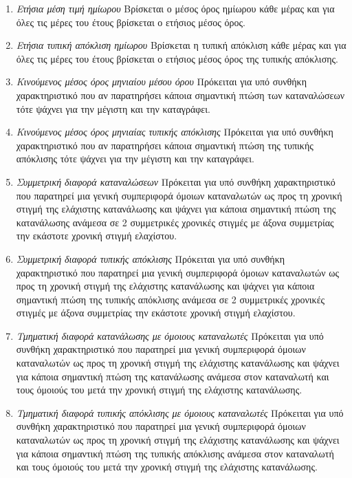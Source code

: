 \documentclass[a4paper, 11pt]{article}
\begin{document}
\begin{enumerate}
\item{\textit{Ετήσια μέση τιμή ημίωρου}} Βρίσκεται ο μέσος όρος ημίωρου κάθε μέρας και για όλες τις μέρες του έτους βρίσκεται ο ετήσιος μέσος όρος.
\item{\textit{Ετήσια τυπική απόκλιση ημίωρου}} Βρίσκεται η τυπική απόκλιση κάθε μέρας και για όλες τις μέρες του έτους βρίσκεται ο ετήσιος μέσος όρος της τυπικής απόκλισης.
\item{\textit{Κινούμενος μέσος όρος μηνιαίου μέσου όρου}} Πρόκειται για υπό συνθήκη χαρακτηριστικό που αν παρατηρήσει κάποια σημαντική πτώση των καταναλώσεων τότε ψάχνει για την μέγιστη και την καταγράφει. 
\item{\textit{Κινούμενος μέσος όρος μηνιαίας τυπικής απόκλισης}} Πρόκειται για υπό συνθήκη χαρακτηριστικό που αν παρατηρήσει κάποια σημαντική πτώση της τυπικής απόκλισης τότε ψάχνει για την μέγιστη και την καταγράφει.
\item{\textit{Συμμετρική διαφορά καταναλώσεων}} Πρόκειται για υπό συνθήκη χαρακτηριστικό που παρατηρεί μια γενική συμπεριφορά όμοιων καταναλωτών ως προς τη χρονική στιγμή της ελάχιστης κατανάλωσης και ψάχνει για κάποια σημαντική πτώση της κατανάλωσης ανάμεσα σε 2 συμμετρικές χρονικές στιγμές με άξονα συμμετρίας την εκάστοτε χρονική στιγμή ελαχίστου.
\item{\textit{Συμμετρική διαφορά τυπικής απόκλισης}} Πρόκειται για υπό συνθήκη χαρακτηριστικό που παρατηρεί μια γενική συμπεριφορά όμοιων καταναλωτών ως προς τη χρονική στιγμή της ελάχιστης κατανάλωσης και ψάχνει για κάποια σημαντική πτώση της τυπικής απόκλισης ανάμεσα σε 2 συμμετρικές χρονικές στιγμές με άξονα συμμετρίας την εκάστοτε χρονική στιγμή ελαχίστου.
\item{\textit{Τμηματική διαφορά κατανάλωσης με όμοιους καταναλωτές}} Πρόκειται για υπό συνθήκη χαρακτηριστικό που παρατηρεί μια γενική συμπεριφορά όμοιων καταναλωτών ως προς τη χρονική στιγμή της ελάχιστης κατανάλωσης και ψάχνει για κάποια σημαντική πτώση της κατανάλωσης ανάμεσα στον καταναλωτή και τους όμοιούς του μετά την χρονική στιγμή της ελάχιστης κατανάλωσης.
\item{\textit{Τμηματική διαφορά τυπικής απόκλισης με όμοιους καταναλωτές}} Πρόκειται για υπό συνθήκη χαρακτηριστικό που παρατηρεί μια γενική συμπεριφορά όμοιων καταναλωτών ως προς τη χρονική στιγμή της ελάχιστης κατανάλωσης και ψάχνει για κάποια σημαντική πτώση της τυπικής απόκλισης ανάμεσα στον καταναλωτή και τους όμοιούς του μετά την χρονική στιγμή της ελάχιστης κατανάλωσης.
\end{enumerate}
\end{document}
